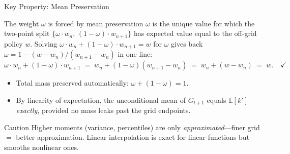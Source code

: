 \documentclass[aspectratio=169,11pt]{beamer}
\newcommand{\emphc}[1]{\textcolor{harvardcrimson}{#1}}
\begin{document}
\begin{frame}{Key Property: Mean Preservation}
\small
\begin{block}{The weight $\omega$ is forced by mean preservation}
$\omega$ is the \emphc{unique} value for which the two-point split $\{\omega \cdot w_n,\, (1-\omega)\cdot w_{n+1}\}$ has expected value equal to the off-grid policy $w$.  Solving $\omega\cdot w_n + (1-\omega)\cdot w_{n+1} = w$ for $\omega$ gives back $\omega = 1 - (w-w_n)/(w_{n+1}-w_n)$ in one line:
\[
\omega\cdot w_n + (1-\omega)\cdot w_{n+1} \;=\; w_n + (1-\omega)(w_{n+1}-w_n) \;=\; w_n + (w-w_n) \;=\; w. \quad\checkmark
\]
\end{block}

\vspace{0.2em}
\begin{itemize}\itemsep1pt
    \item Total mass preserved automatically: $\omega + (1-\omega) = 1$.
    \item By linearity of expectation, the unconditional mean of $G_{t+1}$ equals $\mathbb{E}[k']$ \emph{exactly}, provided no mass leaks past the grid endpoints.
\end{itemize}

\vspace{0.2em}
\begin{alertblock}{Caution}
\emphc{Higher moments} (variance, percentiles) are only \emph{approximated}---finer grid $=$ better approximation. Linear interpolation is exact for linear functions but smooths nonlinear ones.
\end{alertblock}
\end{frame}
\end{document}
